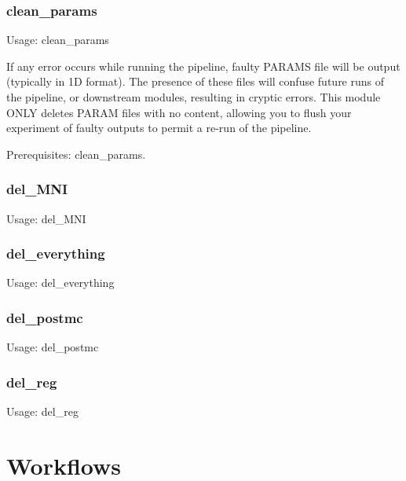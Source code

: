 \documentclass[final,titlepage,letterpaper,oneside,12pt]{article}
\renewcommand{\texttt}[2][BrickRed]{\textcolor{#1}{\ttfamily #2}}%
\begin{document}
\subsubsection{clean\_params}
Usage: \texttt{clean\_params}

\noindent If any error occurs while running the pipeline, faulty PARAMS file will be output (typically in 1D format). The presence of these files will confuse future runs of the pipeline, or downstream modules, resulting in cryptic errors. This module ONLY deletes PARAM files with no content, allowing you to flush your experiment of faulty outputs to permit a re-run of the pipeline.

Prerequisites: \texttt{clean\_params}.

\subsubsection{del\_MNI}
Usage: \texttt{del\_MNI}

\subsubsection{del\_everything}
Usage: \texttt{del\_everything}

\subsubsection{del\_postmc}
Usage: \texttt{del\_postmc}

\subsubsection{del\_reg}
Usage: \texttt{del\_reg}

\section{Workflows}
\end{document}
